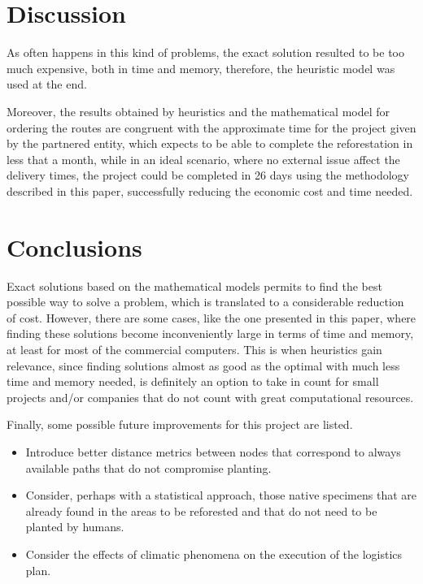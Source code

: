 \documentclass{amsart}
\begin{document}

    \section{Discussion}
    
    As often happens in this kind of problems, the exact solution resulted to be too much expensive, both in time and memory, therefore, the heuristic model was used at the end.
    
    Moreover, the results obtained by heuristics and the mathematical model for ordering the routes are congruent with the approximate time for the project given by the partnered entity, which expects to be able to complete the reforestation in less that a month, while in an ideal scenario, where no external issue affect the delivery times, the project could be completed in 26 days using the methodology described in this paper, successfully reducing the economic cost and time needed.

    
    \section{Conclusions}
    Exact solutions based on the mathematical models permits to find the best possible way to solve a problem, which is translated to a considerable reduction of cost. However, there are some cases, like the one presented in this paper, where finding these solutions become inconveniently large in terms of time and memory, at least for most of the commercial computers. This is when heuristics gain relevance, since finding solutions almost as good as the optimal with much less time and memory needed, is definitely an option to take in count for small projects and/or companies that do not count with great computational resources. 

    Finally, some possible future improvements for this project are listed.
    
    \begin{itemize}
        \item Introduce better distance metrics between nodes that correspond to always available paths that do not compromise planting.
        \item Consider, perhaps with a statistical approach, those native specimens that are already found in the areas to be reforested and that do not need to be planted by humans.
        \item Consider the effects of climatic phenomena on the execution of the logistics plan.
    \end{itemize}
\end{document}
